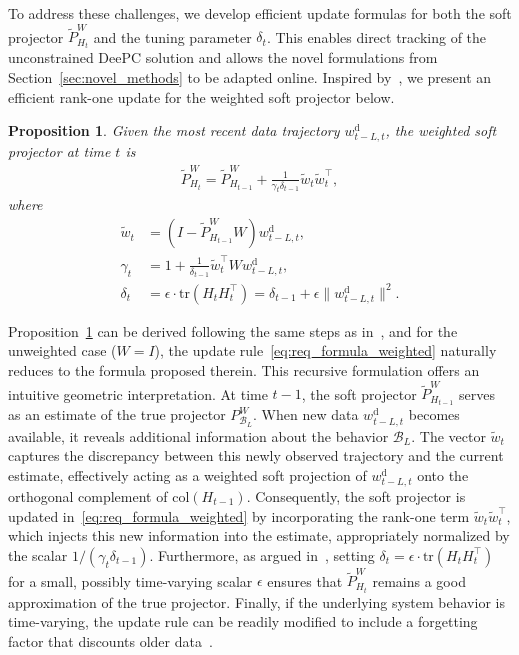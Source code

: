 \documentclass[letterpaper, 10 pt, conference]{ieeeconf}
\newtheorem{prop}{Proposition}
\begin{document}
To address these challenges, we develop efficient update formulas for both the soft projector $\tilde{P}^W_{H_t}$ and the tuning parameter $\delta_t$. This enables direct tracking of the unconstrained \gls{DeePC} solution and allows the novel formulations from Section~\ref{sec:novel_methods} to be adapted online.
Inspired by~\cite{wax2023robust}, we present an efficient rank-one update for the weighted soft projector below.
\begin{prop} \label{prop:update}
    Given the most recent data trajectory $w^\mathrm{d}_{t-L,t}$, the weighted soft projector at time $t$ is
    \begin{align} \label{eq:req_formula_weighted}
        \tilde{P}_{H_t}^W = \tilde{P}_{H_{t-1}}^W + \frac{1}{\gamma_{t} \delta_{t-1}} \tilde{w}_t \tilde{w}_t^\top,
    \end{align}
    where 
    \begin{align*}
        \tilde{w}_t &= (I-\tilde{P}_{H_{t-1}}^W W) w^\mathrm{d}_{t-L,t}, \\
        \gamma_{t} & = 1 + \frac{1}{\delta_{t-1}} \tilde{w}_t^\top W w^\mathrm{d}_{t-L,t}, \\
        \delta_t & = \epsilon \cdot \mathrm{tr}(H_t H_t^\top) = \delta_{t-1} + \epsilon \|w^\mathrm{d}_{t-L,t}\|^2.
    \end{align*}
\end{prop}
Proposition~\ref{prop:update} can be derived following the same steps as in~\cite{wax2023robust}, and for the unweighted case ($W=I$), the update rule~\eqref{eq:req_formula_weighted} naturally reduces to the formula proposed therein.
This recursive formulation offers an intuitive geometric interpretation.
At time $t-1$, the soft projector $\tilde{P}_{H_{t-1}}^W$ serves as an estimate of the true projector $P_{\mathcal{B}_L}^W$.
When new data $w^\mathrm{d}_{t-L,t}$ becomes available, it reveals additional information about the behavior $\mathcal{B}_L$. 
The vector $\tilde{w}_t$ captures the discrepancy between this newly observed trajectory and the current estimate, effectively acting as a weighted soft projection of $w^\mathrm{d}_{t-L,t}$ onto the orthogonal complement of $\mathrm{col}(H_{t-1})$.
Consequently, the soft projector is updated in~\eqref{eq:req_formula_weighted} by incorporating the rank-one term $\tilde{w}_t\tilde{w}_t^\top$, which injects this new information into the estimate, appropriately normalized by the scalar $1 / (\gamma_t \delta_{t-1})$. 
Furthermore, as argued in~\cite{wax2021detection,wax2023robust}, setting $\delta_t = \epsilon \cdot \mathrm{tr}(H_t H_t^\top)$ for a small, possibly time-varying scalar $\epsilon$ ensures that $\tilde{P}_{H_t}^W$ remains a good approximation of the true projector.
Finally, if the underlying system behavior is time-varying, the update rule can be readily modified to include a forgetting factor that discounts older data~\cite{wax2023robust}.
\end{document}
